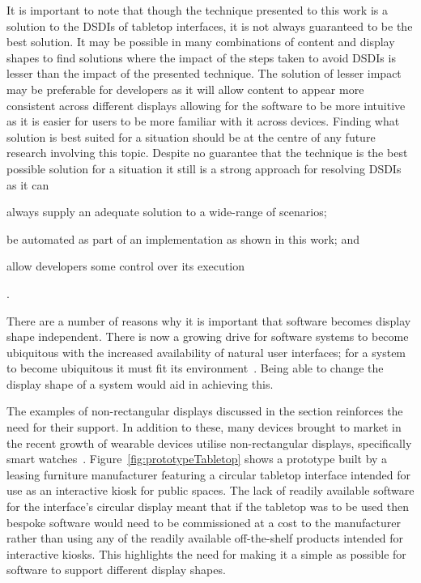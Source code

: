 \documentclass{bmcart}
\begin{document}
It is important to note that though the technique presented to this work is a solution to the \acp{DSDI} of tabletop interfaces, it is not always guaranteed to be the best solution.
It may be possible in many combinations of content and display shapes to find solutions where the impact of the steps taken to avoid \acp{DSDI} is lesser than the impact of the presented technique.
The solution of lesser impact may be preferable for developers as it will allow content to appear more consistent across different displays allowing for the software to be more intuitive as it is easier for users to be more familiar with it across devices.
Finding what solution is best suited for a situation should be at the centre of any future research involving this topic.
Despite no guarantee that the technique is the best possible solution for a situation it still is a strong approach for resolving \acp{DSDI} as it can \begin{inparaenum}[(i)] \item always supply an adequate solution to a wide-range of scenarios; \item be automated as part of an implementation as shown in this work; and \item allow developers some control over its execution\end{inparaenum}.

There are a number of reasons why it is important that software becomes display shape independent.
There is now a growing drive for software systems to become ubiquitous with the increased availability of natural user interfaces; for a system to become ubiquitous it must fit its environment~\cite{Greenfield2006}.
Being able to change the display shape of a system would aid in achieving this.


The examples of non-rectangular displays discussed in the  section reinforces the need for their support.
In addition to these, many devices brought to market in the recent growth of wearable devices utilise non-rectangular displays, specifically smart watches~\cite{Jung2016}.
Figure~\ref{fig:prototypeTabletop} shows a prototype built by a leasing furniture manufacturer featuring a circular tabletop interface intended for use as an interactive kiosk for public spaces.
The lack of readily available software for the interface's circular display meant that if the tabletop was to be used then bespoke software would need to be commissioned at a cost to the manufacturer rather than using any of the readily available off-the-shelf products intended for interactive kiosks.
This highlights the need for making it a simple as possible for software to support different display shapes.
\end{document}

